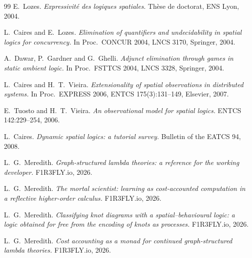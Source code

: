 \documentclass[11pt]{article}
\theoremstyle{plain}
\theoremstyle{definition}
\begin{document}
\begin{thebibliography}{99}
 E.\ Lozes. \emph{Expressivit\'e des logiques spatiales.} Th\`ese de doctorat,
ENS Lyon, 2004.

 L.\ Caires and E.\ Lozes. \emph{Elimination of quantifiers and undecidability in
spatial logics for concurrency.} In Proc.\ CONCUR 2004, LNCS 3170, Springer, 2004.

 A.\ Dawar, P.\ Gardner and G.\ Ghelli. \emph{Adjunct elimination through games in static
ambient logic.} In Proc.\ FSTTCS 2004, LNCS 3328, Springer, 2004.

 L.\ Caires and H.\ T.\ Vieira. \emph{Extensionality of spatial observations in
distributed systems.} In Proc.\ EXPRESS 2006, ENTCS 175(3):131--149, Elsevier, 2007.

 E.\ Tuosto and H.\ T.\ Vieira. \emph{An observational model for spatial logics.}
ENTCS 142:229--254, 2006.

 L.\ Caires. \emph{Dynamic spatial logics: a tutorial survey.} Bulletin of the
EATCS 94, 2008.

 L.\ G.\ Meredith. \emph{Graph-structured lambda theories: a reference for the working
developer.} F1R3FLY.io, 2026.

 L.\ G.\ Meredith. \emph{The mortal scientist: learning as cost-accounted
computation in a reflective higher-order calculus.} F1R3FLY.io, 2026.

 L.\ G.\ Meredith. \emph{Classifying knot diagrams with a spatial--behavioural
logic: a logic obtained for free from the encoding of knots as processes.} F1R3FLY.io, 2026.

 L.\ G.\ Meredith. \emph{Cost accounting as a monad for continued graph-structured
lambda theories.} F1R3FLY.io, 2026.

\end{thebibliography}
\end{document}
